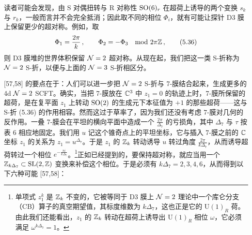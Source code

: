 读者可能会发现，由 S 对偶扭转与 R 对称性 $\mathrm{SO}(6)_r$ 在超荷上诱导的两个变换 $s_k$ 与 $r_k$，一般而言并不会完全抵消；因此取不同的相位 $\Phi_i$，就有可能让探针 D3 膜上保留更少的超对称。例如，取
\begin{equation}
\Phi_1 = \frac{2\pi}{k}\,,\qquad \Phi_2 = -\Phi_3 \quad \mathrm{mod}\ 2\pi\mathbb{Z}\,,
\tag{5.36}
\end{equation}
则 D3 膜堆的世界体积保留 $\mathcal{N}=2$ 超对称。从现在起，我们把这一类 S-折称为 $\mathcal{N}=2$ S-折，以便与上面的 $\mathcal{N}=3$ S-折相区分。

[57,58] 的要点在于：人们可以进一步把 $\mathcal{N}=2$ S-折与 7-膜结合起来，生成更多的 4d $\mathcal{N}=2$ SCFT。确实，当把 7-膜放在 $\mathbb{C}^3$ 中 $z_1=0$ 的轨迹上时，7-膜所保留的超荷，是在复平面 $z_1$ 上转动 $\mathrm{SO}(2)$ 的生成元下本征值为 $+1$ 的那些超荷——这与 S-折 (5.36) 的作用相容。然而这过于草率了，因为我们还没有考虑 7-膜对几何的反作用。一叠 7-膜会在平坦的横向平面中造成一个 $\frac{2\pi}{\Delta_7}$ 的亏损角，其中 $\Delta_7$ 与 $\tau$ 按表 6 相应地固定。我们用 $u$ 记这个锥奇点上的平坦坐标，它与插入 7-膜之前的 $\mathbb{C}$ 坐标 $z_1$ 的关系为 $z_1=u^{\Delta_7}$。于是 $z_1$ 的 $\mathbb{Z}_k$ 转动诱导 $u$ 转过角度 $\frac{2\pi}{k\Delta_7}$，从而诱导超荷转过一个相位 $e^{-\frac{\pi i}{k\Delta_7}}$。\footnote{单项式 $z_1^k$ 是 $\mathbb{Z}_k$ 不变的，它被等同于 D3 膜上 $\mathcal{N}=2$ 理论中一个库仑分支（CB）算子的真空期望值，其标度维数为 $k\Delta_7$，这也正是它的 $\mathrm{U}(1)_R$ 荷。由此我们还能看出，$z_1$ 的 $\mathbb{Z}_k$ 转动在超荷上诱导出 $\mathrm{U}(1)_R$ 相位 $\omega$，它必须满足 $\omega^{k\Delta_7}=1$。}正如已经提到的，要保持超对称，就应当用一个 $\mathbb{Z}_{k\Delta_7}\subset\mathrm{SL}(2,\mathbb{Z})$ 变换来补偿这个相位。于是必须有 $k\Delta_7=2,3,4,6$，从而得到以下六种可能 [57,58]：

